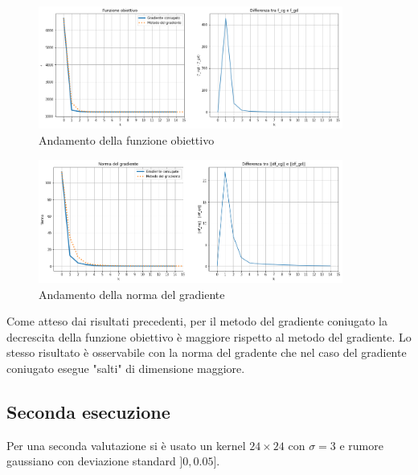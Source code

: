 \documentclass[11pt]{article}
\begin{document}
\begin{figure}[H]
    \centering
    \includegraphics[width=10cm]{iterazioni_cg_gd/1/funzione_obiettivo.png}
    \caption{Andamento della funzione obiettivo}
    \label{fig:obiettivo1}
\end{figure}
\begin{figure}[H]
    \centering
    \includegraphics[width=10cm]{iterazioni_cg_gd/1/norma_gradiente.png}
    \caption{Andamento della norma del gradiente}
    \label{fig:gradiente1}
\end{figure}
Come atteso dai risultati precedenti, per il metodo del gradiente coniugato la decrescita della funzione obiettivo è maggiore rispetto al metodo del gradiente. 
Lo stesso risultato è osservabile con la norma del gradente che nel caso del gradiente coniugato esegue "salti" di dimensione maggiore.

\subsection{Seconda esecuzione}
Per una seconda valutazione si è usato un kernel $24 \times 24$ con $\sigma=3$ e rumore gaussiano con deviazione standard $]0, 0.05]$.\\
\end{document}
